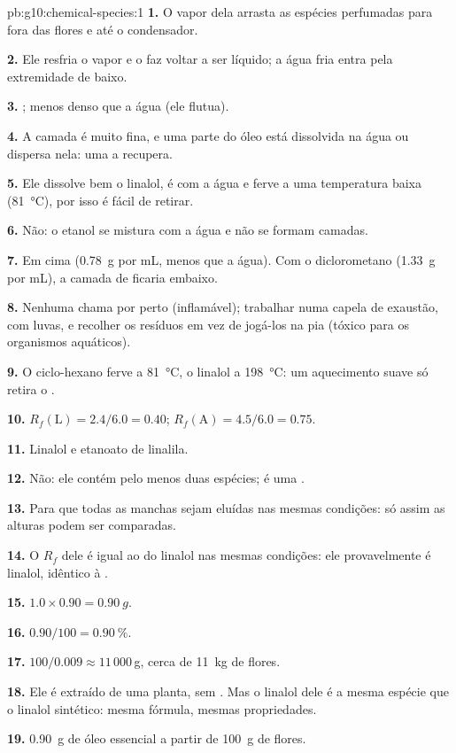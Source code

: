 \begin{solution}{pb:g10:chemical-species:1}
\textbf{1.} O vapor dela arrasta as espécies perfumadas para fora das
flores e até o condensador.

\textbf{2.} Ele resfria o vapor e o faz voltar a ser líquido; a água fria
entra pela extremidade de baixo.

\textbf{3.} ; menos denso que a água (ele flutua).

\textbf{4.} A camada é muito fina, e uma parte do óleo está dissolvida
na água ou dispersa nela: uma  a recupera.

\textbf{5.} Ele dissolve bem o linalol, é  com a água e ferve a
uma temperatura baixa (\qty{81}{\celsius}), por isso é fácil de retirar.

\textbf{6.} Não: o etanol se mistura com a água e não se formam camadas.

\textbf{7.} Em cima (\qty{0.78}{g} por mL, menos que a água). Com o
diclorometano (\qty{1.33}{g} por mL), a camada de  ficaria
embaixo.

\textbf{8.} Nenhuma chama por perto (inflamável); trabalhar numa capela
de exaustão, com luvas, e recolher os resíduos em vez de jogá-los na pia
(tóxico para os organismos aquáticos).

\textbf{9.} O ciclo-hexano ferve a \qty{81}{\celsius}, o linalol a
\qty{198}{\celsius}: um aquecimento suave só retira o .

\textbf{10.} $R_f(\text{L}) = 2.4/6.0 = 0.40$; $R_f(\text{A}) = 4.5/6.0
= 0.75$.

\textbf{11.} Linalol e etanoato de linalila.

\textbf{12.} Não: ele contém pelo menos duas espécies; é uma .

\textbf{13.} Para que todas as manchas sejam eluídas nas mesmas
condições: só assim as alturas podem ser comparadas.

\textbf{14.} O $R_f$ dele é igual ao do linalol nas mesmas condições: ele
provavelmente é linalol, idêntico à .

\textbf{15.} $1.0 \times 0.90 = \qty{0.90}{g}$.

\textbf{16.} $0.90/100 = \qty{0.90}{\percent}$.

\textbf{17.} $100/0.009 \approx 11\,000$\,g, cerca de \qty{11}{kg} de
flores.

\textbf{18.} Ele é extraído de uma planta, sem . Mas
o linalol dele é a mesma espécie que o linalol sintético: mesma fórmula,
mesmas propriedades.

\textbf{19.} \qty{0.90}{g} de óleo essencial a partir de \qty{100}{g} de
flores.
\end{solution}

